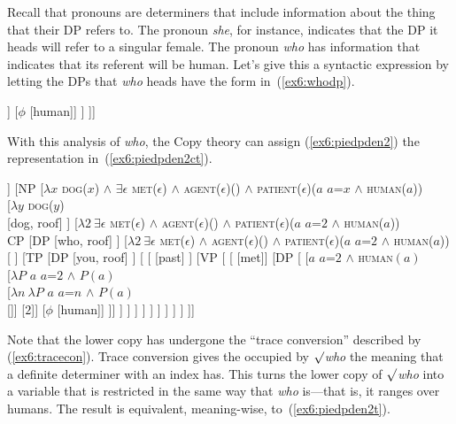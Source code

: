 Recall that pronouns are determiners that include information about the thing that their DP refers to. The pronoun \emph{she}, for instance, indicates that the DP it heads will refer to a singular female. The pronoun \emph{who} has information that indicates that its referent will be human. Let's give this a syntactic expression by letting the DPs that \emph{who} heads have the form in~(\ref{ex6:whodp}).
\begin{exe}
\raggedright
	\ex \label{ex6:whodp}
	\footnotesize
	\begin{forest}
	[DP [\ibar{D}
		[\obar{D} 
		[\obar{D} [$\surd$who]]
		[$\phi$ [human]]
		]
	]]
	\end{forest}
\end{exe}
With this analysis of \emph{who}, the Copy theory can assign (\ref{ex6:piedpden2}) the representation in~(\ref{ex6:piedpden2ct}).
\medskip
\begin{fullwidth}
\begin{exe}
\raggedright
	\ex \label{ex6:piedpden2ct}
	\footnotesize
	\begin{forest}
		[DP [\ibar{D}
			[\obar{D} [the]]
			[NP [$\lambda x$ \textsc{dog}($x$) $\wedge$ $\exists \epsilon$ \textsc{met}($\epsilon$) $\wedge$ \textsc{agent}($\epsilon$)() $\wedge$ \textsc{patient}($\epsilon$)(\rotiota $a$ $a${=}$x$ $\wedge$ \textsc{human}($a$))\\
				[$\lambda y$ \textsc{dog}($y$)\\ ]
				[$\lambda 2\ \exists \epsilon$ \textsc{met}($\epsilon$) $\wedge$ \textsc{agent}($\epsilon$)() $\wedge$ \textsc{patient}($\epsilon$)(\rotiota $a$ $a${=}$2$ $\wedge$ \textsc{human}($a$))\\CP
					[DP [who, roof] ]
					[$\lambda 2\ \exists \epsilon$ \textsc{met}($\epsilon$) $\wedge$ \textsc{agent}($\epsilon$)() $\wedge$ \textsc{patient}($\epsilon$)(\rotiota $a$ $a${=}$2$ $\wedge$ \textsc{human}($a$))\\
						[ ]
						[TP
							[DP [you, roof] ]
							[
								[ [past] ]
								[VP [
									[ [met]]
									[DP [
										[\rotiota $a$ $a${=}$2$ $\wedge$ \textsc{human}$(a)$\\ 
										[$\lambda P$ \rotiota $a$ $a${=}$2$ $\wedge$ $P(a)$\\ [$\lambda n\ \lambda P$ \rotiota $a$ $a${=}$n$ $\wedge$ $P(a)$\\
										[]]
										[$2$]]
									[$\phi$ [human]]
									]]
									]
								] ]
							 ]
						 ]
					 ]
				 ]
			] ]
		]]
		\end{forest}
\end{exe}
\end{fullwidth}
\medskip
Note that the lower copy has undergone the ``trace conversion'' described by (\ref{ex6:tracecon}). Trace conversion gives the  occupied by \emph{$\surd$who} the meaning that a definite determiner with an index has. This turns the lower copy of \emph{$\surd$who} into a variable that is restricted in the same way that \emph{who} is---that is, it ranges over humans. The result is equivalent, meaning-wise, to~(\ref{ex6:piedpden2t}).

